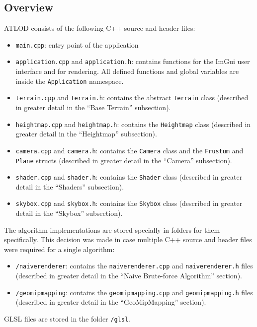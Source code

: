 \subsection{Overview}
ATLOD consists of the following C++ source and header files: 
\begin{itemize}
  \item \texttt{main.cpp}: entry point of the application
  \item \texttt{application.cpp} and \texttt{application.h}: contains functions for the ImGui user interface and for rendering. All defined functions and global variables are inside the \texttt{Application} namespace. 
  \item \texttt{terrain.cpp} and \texttt{terrain.h}: contains the abstract \texttt{Terrain} class (described in greater detail in the ``Base Terrain'' subsection).
  \item \texttt{heightmap.cpp} and \texttt{heightmap.h}: contains the \texttt{Heightmap} class (described in greater detail in the ``Heightmap'' subsection).
  \item \texttt{camera.cpp} and \texttt{camera.h}: contains the \texttt{Camera} class and the \texttt{Frustum} and \texttt{Plane} structs (described in greater detail in the ``Camera'' subsection).
  \item \texttt{shader.cpp} and \texttt{shader.h}: contains the \texttt{Shader} class (described in greater detail in the ``Shaders'' subsection).
  \item \texttt{skybox.cpp} and \texttt{skybox.h}: contains the \texttt{Skybox} class (described in greater detail in the ``Skybox'' subsection).
\end{itemize}

The algorithm implementations are stored specially in folders for them specifically. This decision was made in case 
multiple C++ source and header files were required for a single algorithm:
\begin{itemize}
  \item \texttt{/naiverenderer}: contains the \texttt{naiverenderer.cpp} and \texttt{naiverenderer.h} files (described in greater detail in the ``Naive Brute-force Algorithm'' section).
  \item \texttt{/geomipmapping}: contains the \texttt{geomipmapping.cpp} and \texttt{geomipmapping.h} files (described in greater detail in the ``GeoMipMapping'' section).
\end{itemize}

GLSL files are stored in the folder \texttt{/glsl}.

